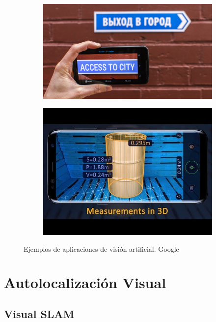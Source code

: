 \documentclass[a4paper, 12pt]{book}
\begin{document}
\begin{figure}[ht]
\centering
\begin{subfigure}{0.3\textwidth}
  \centering
  \includegraphics[scale=0.4]{img/google-translate-word-lens.jpg}
\end{subfigure}%
\qquad
\qquad
\qquad
\qquad
\qquad
\qquad
\begin{subfigure}{0.3\textwidth}
  \centering
  \includegraphics[scale=0.425]{img/measure-app.jpg}
\end{subfigure}%
\caption{Ejemplos de aplicaciones de visión artificial. Google}%
\end{figure}

\section{Autolocalización Visual}
\label{sec:autolocalizacionvisual}

\subsection{Visual SLAM}
\label{subsec:visualslam}
\end{document}
